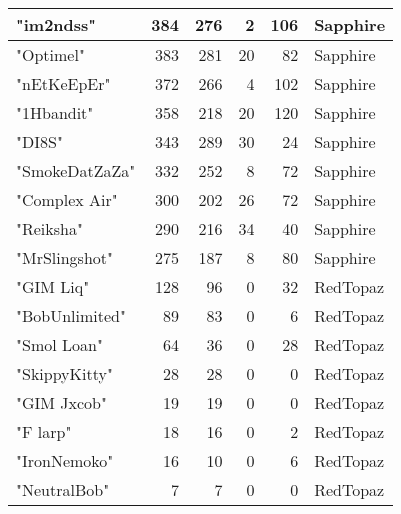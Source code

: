 \documentclass{article}
\begin{document}
\begin{table}[htbp]
\begin{tabular}{|l|r|r|r|r|l|}
"im2ndss" & 384 & 276 & 2 & 106 & Sapphire \\ \hline
"Optimel" & 383 & 281 & 20 & 82 & Sapphire \\ \hline
"nEtKeEpEr" & 372 & 266 & 4 & 102 & Sapphire \\ \hline
"1Hbandit" & 358 & 218 & 20 & 120 & Sapphire \\ \hline
"DI8S" & 343 & 289 & 30 & 24 & Sapphire \\ \hline
"SmokeDatZaZa" & 332 & 252 & 8 & 72 & Sapphire \\ \hline
"Complex Air" & 300 & 202 & 26 & 72 & Sapphire \\ \hline
"Reiksha" & 290 & 216 & 34 & 40 & Sapphire \\ \hline
"MrSlingshot" & 275 & 187 & 8 & 80 & Sapphire \\ \hline
"GIM Liq" & 128 & 96 & 0 & 32 & RedTopaz \\ \hline
"BobUnlimited" & 89 & 83 & 0 & 6 & RedTopaz \\ \hline
"Smol Loan" & 64 & 36 & 0 & 28 & RedTopaz \\ \hline
"SkippyKitty" & 28 & 28 & 0 & 0 & RedTopaz \\ \hline
"GIM Jxcob" & 19 & 19 & 0 & 0 & RedTopaz \\ \hline
"F larp" & 18 & 16 & 0 & 2 & RedTopaz \\ \hline
"IronNemoko" & 16 & 10 & 0 & 6 & RedTopaz \\ \hline
"NeutralBob" & 7 & 7 & 0 & 0 & RedTopaz \\ \hline
\end{tabular}
\end{table}
\end{document}
